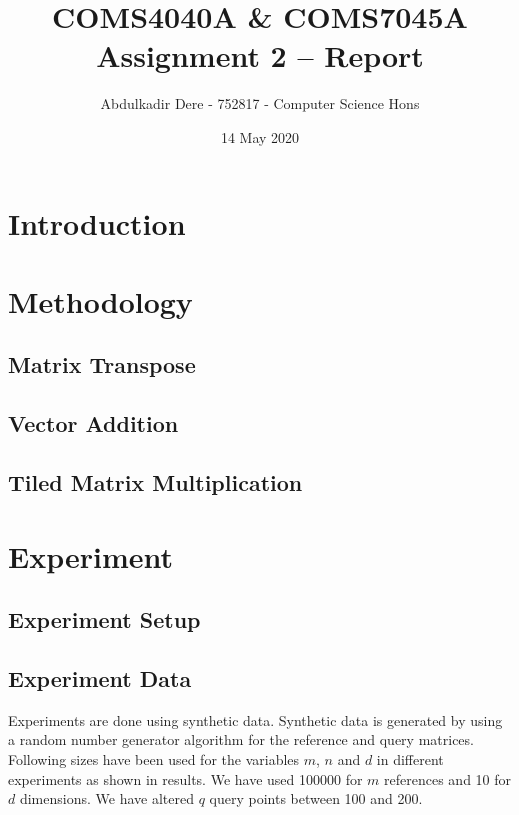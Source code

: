 

\title{COMS4040A \& COMS7045A Assignment 2 -- Report}
\author{Abdulkadir Dere - 752817 - Computer Science Hons}
\date{14 May 2020} 
\maketitle 
\pagestyle{fancy}
\fancyhf{}
\fancyhead[R]{\thepage}
\section{Introduction} 

\section{Methodology} 
\subsection{Matrix Transpose}

\subsection{Vector Addition}

\subsection{Tiled Matrix Multiplication}

\section{Experiment} 
\subsection{Experiment Setup}


\subsection{Experiment Data}
Experiments are done using synthetic data. Synthetic data is generated by using a random number generator algorithm for the reference and query matrices. Following sizes have been used for the variables $m$, $n$ and $d$ in different experiments as shown in results. We have used 100000 for $m$ references and 10 for $d$ dimensions. We have altered $q$ query points between 100 and 200.

